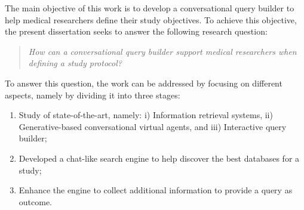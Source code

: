 The main objective of this work is to develop a conversational query builder to help medical researchers define their study objectives. To achieve this objective, the present dissertation seeks to answer the following research question:

\begin{quote}
    \small\textit{How can a conversational query builder support medical researchers when defining a study protocol?}
\end{quote}

To answer this question, the work can be addressed by focusing on different aspects, namely by dividing it into three stages:

\begin{enumerate}
    \item Study of state-of-the-art, namely: i) Information retrieval systems, ii) Generative-based conversational virtual agents, and iii) Interactive query builder;
    \item Developed a chat-like search engine to help discover the best databases for a study;
    \item Enhance the engine to collect additional information to provide a query as outcome. 
\end{enumerate}




